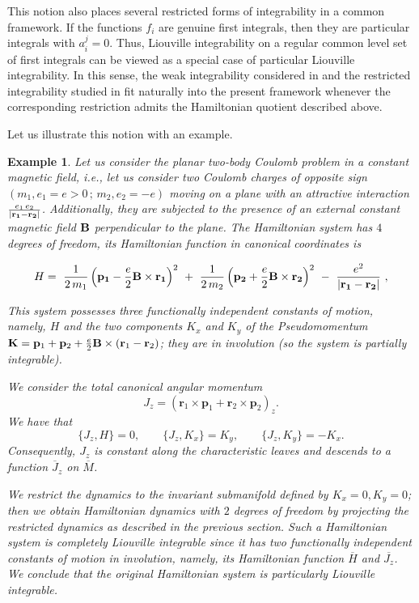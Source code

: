 \documentclass[10pt,a4paper]{article}
\newtheorem{example}{Example}
\begin{document}
This notion also places several restricted forms of integrability in a common framework. If the functions $f_i$ are genuine first integrals, then they are particular integrals with $a_i^j=0$. Thus, Liouville integrability on a regular common level set of first integrals can be viewed as a special case of particular Liouville integrability. In this sense, the weak integrability considered in \cite{rosquist1995invariants,pucacco2004non} and the restricted integrability studied in \cite{maciejewski2025non} fit naturally into the present framework whenever the corresponding restriction admits the Hamiltonian quotient described above.

Let us illustrate this notion with an example.

\begin{example}
Let us consider the planar two-body Coulomb problem in a constant magnetic field, i.e., let us consider two Coulomb charges of opposite sign $(m_1,e_1=e>0\,;\,m_2,e_2=-e)$ moving on a plane with an attractive interaction $\frac{e_1\,e_2}{|\bf{r}_1-\bf{r}_2|}$. Additionally, they are subjected to the presence of an external constant magnetic field $\bf{B}$ perpendicular to the plane. The Hamiltonian system has $4$ degrees of freedom, its Hamiltonian function in canonical coordinates is

\begin{equation*}
H = \ \frac{1}{2\,m_1}\left({\bf{p}_1}-\frac{e}{2}{\bf{B}}\times
{\bf{r}_1}\right)^2 \ + \ \frac{1}{2\,m_2}\left({\bf{p}_2}+\frac{e}{2}{\bf{B}}\times
{\bf{r}_2}\right)^2 \ - \  \frac{e^2}{|\bf{r}_1-\bf{r}_2|} \ ,
\end{equation*}

This system possesses three functionally independent constants of motion, namely, $H$ and the two components $K_{x}$ and $K_{y}$ of the Pseudomomentum ${\bf K}={\bf p}_1+{\bf p}_2+\frac{e}{2}{\bf B}\times ({\bf r}_{1}-{\bf r}_2)$; they are in involution (so the system is partially integrable).

We consider the total canonical angular momentum
\[
J_z=(\boldsymbol r_1\times\boldsymbol p_1+\boldsymbol r_2\times\boldsymbol p_2)_z.
\]
We have that
\[
  \{J_z,H\}=0,
  \qquad
  \{J_z,K_x\}=K_y,
  \qquad
  \{J_z,K_y\}=-K_x.
\]
Consequently, $J_z$ is constant along the characteristic leaves and descends to a function $\overline{J}_{z}$ on $\overline{M}$.

We restrict the dynamics to the invariant submanifold defined by $K_{x}=0,K_{y}=0$; then we obtain Hamiltonian dynamics with $2$ degrees of freedom by projecting the restricted dynamics as described in the previous section. Such a Hamiltonian system is completely Liouville integrable since it has two functionally independent constants of motion in involution, namely, its Hamiltonian function $\overline{H}$ and $\overline{J_z}$. We conclude that the original Hamiltonian system is particularly Liouville integrable.
\end{example}
\end{document}
